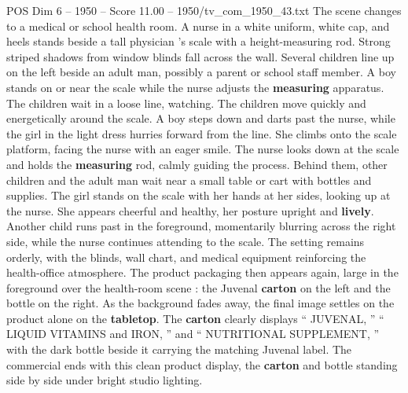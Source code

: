 \begin{textsample}{POS Dim 6 – 1950 – Score 11.00 – 1950/tv\_com\_1950\_43.txt}
The scene changes to a medical or school health room.
A nurse in a white uniform, white cap, and heels stands beside a tall physician ’s scale with a height-measuring rod.
Strong striped shadows from window blinds fall across the wall.
Several children line up on the left beside an adult man, possibly a parent or school staff member.
A boy stands on or near the scale while the nurse adjusts the \textbf{measuring} apparatus.
The children wait in a loose line, watching.
The children move quickly and energetically around the scale.
A boy steps down and darts past the nurse, while the girl in the light dress hurries forward from the line.
She climbs onto the scale platform, facing the nurse with an eager smile.
The nurse looks down at the scale and holds the \textbf{measuring} rod, calmly guiding the process.
Behind them, other children and the adult man wait near a small table or cart with bottles and supplies.
The girl stands on the scale with her hands at her sides, looking up at the nurse.
She appears cheerful and healthy, her posture upright and \textbf{lively}.
Another child runs past in the foreground, momentarily blurring across the right side, while the nurse continues attending to the scale.
The setting remains orderly, with the blinds, wall chart, and medical equipment reinforcing the health-office atmosphere.
The product packaging then appears again, large in the foreground over the health-room scene : the Juvenal \textbf{carton} on the left and the bottle on the right.
As the background fades away, the final image settles on the product alone on the \textbf{tabletop}.
The \textbf{carton} clearly displays “ JUVENAL, ” “ LIQUID VITAMINS and IRON, ” and “ NUTRITIONAL SUPPLEMENT, ” with the dark bottle beside it carrying the matching Juvenal label.
The commercial ends with this clean product display, the \textbf{carton} and bottle standing side by side under bright studio lighting.

\end{textsample}
